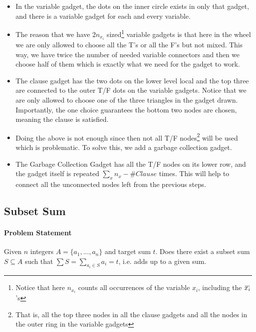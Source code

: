 \documentclass[10pt]{article}
\newcommand{\overbar}[1]{\mkern 1.5mu\overline{\mkern-1.5mu#1\mkern-1.5mu}\mkern 1.5mu}
\begin{document}
\begin{itemize}
    \item In the variable gadget, the dots on the inner circle exists in only that gadget, and there is a variable gadget for each and every variable.
    \item The reason that we have $2n_{x_i}$ sized\footnote{Notice that here $n_{x_i}$ counts all occurrences of the variable $x_i$, including the $\overbar{x_i}$'s} variable gadgets is that here in the wheel we are only allowed to choose all the T's or all the F's but not mixed. This way, we have twice the number of needed variable connectors and then we choose half of them which is exactly what we need for the gadget to work. 
    \item The clause gadget has the two dots on the lower level local and the top three are connected to the outer T/F dots on the variable gadgets. Notice that we are only allowed to choose one of the three triangles in the gadget drawn. Importantly, the one choice guarantees the bottom two nodes are chosen, meaning the clause is satisfied. 
    \item Doing the above is not enough since then not all T/F nodes\footnote{That is, all the top three nodes in all the clause gadgets and all the nodes in the outer ring in the variable gadgets} will be used which is problematic. To solve this, we add a garbage collection gadget.
    \item The Garbage Collection Gadget has all the T/F nodes on its lower row, and the gadget itself is repeated $\sum_x n_x - \#Clause$ times. This will help to connect all the unconnected nodes left from the previous steps.  
\end{itemize}

\subsection{Subset Sum}
\paragraph{Problem Statement} Given $n$ integers $A = \{a_1, ..., a_n\}$ and target sum $t$. Does there exist a subset sum $S\subseteq A$ such that $\sum S = \sum_{a_i \in S} a_i = t$, i.e. adds up to a given sum.
\end{document}
